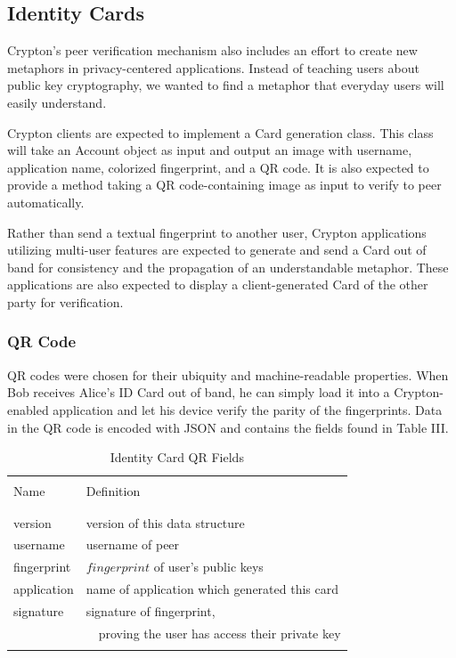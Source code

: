 \documentclass[conference]{IEEEtran}
\begin{document}
\subsection{Identity Cards}
Crypton's peer verification mechanism also includes an effort
to create new metaphors in privacy-centered applications. Instead of teaching
users about public key cryptography, we wanted to find a metaphor that everyday
users will easily understand.

Crypton clients are expected to implement a Card generation class. This class
will take an Account object as input and output an image with username, application
name, colorized fingerprint, and a QR code. It is also expected to provide a method
taking a QR code-containing image as input to verify to peer automatically.

Rather than send a textual fingerprint to another user, Crypton applications
utilizing multi-user features are expected to generate and send a Card out of band
for consistency and the propagation of an understandable metaphor. These applications
are also expected to display a client-generated Card of the other party for verification.

\subsubsection{QR Code}
QR codes were chosen for their ubiquity and machine-readable properties. When
Bob receives Alice's ID Card out of band, he can simply load it into a
Crypton-enabled application and let his device verify the parity of the fingerprints.
Data in the QR code is encoded with JSON and contains the fields found in Table III.

\begin{table}[h]
\caption{Identity Card QR Fields}
\centering
\begin{tabular}{l l}
\hline\hline
\\ [0.1ex]
Name & Definition \\
\\ [0.1ex]
\hline
\\ [0.3ex]
version & version of this data structure \\
username & username of peer \\
fingerprint & \(fingerprint\) of user's public keys  \\
application & name of application which generated this card \\
signature & signature of fingerprint, \\
  & \ \ proving the user has access their private key \\
\\ [0.3ex]
\hline
\end{tabular}
\label{table:nonlin}
\end{table}
\end{document}
